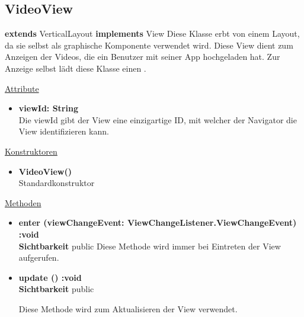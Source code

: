 \newpage
\subsection{VideoView}\label{VideoView}
\textbf{extends}  VerticalLayout \newline
\textbf{implements} View \newline
Diese Klasse erbt von einem Layout, da sie selbst als graphische Komponente verwendet wird. Diese View dient zum Anzeigen der Videos, die ein Benutzer mit seiner App hochgeladen hat. Zur Anzeige selbst lädt diese Klasse einen .
\newline

\underline{Attribute}
\begin{itemize}
\itemsep0pt
\item \textbf{viewId: String} \hfill\\ 
Die viewId gibt der View eine einzigartige ID, mit welcher der Navigator die View identifizieren kann.

\end{itemize}

\underline{Konstruktoren}
\begin{itemize}
\itemsep0pt
\item \textbf{VideoView()} \hfill\\
Standardkonstruktor
\end{itemize}

\underline{Methoden}
\begin{itemize}
\itemsep0pt
\item \textbf{enter (viewChangeEvent: ViewChangeListener.ViewChangeEvent) :void}\hfill\\
\textbf{Sichtbarkeit} public
Diese Methode wird immer bei Eintreten der View aufgerufen.

\item \textbf{update () :void}\hfill\\
\textbf{Sichtbarkeit} public

Diese Methode wird zum Aktualisieren der View verwendet.

\end{itemize}
